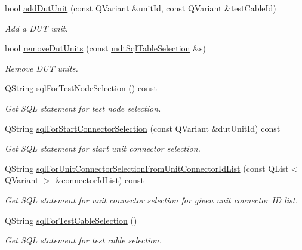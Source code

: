 \begin{DoxyCompactItemize}
bool \hyperlink{classmdt_tt_logical_test_cable_a80a8aea9231b2114d7d134340196cc86}{add\-Dut\-Unit} (const Q\-Variant \&unit\-Id, const Q\-Variant \&test\-Cable\-Id)
\begin{DoxyCompactList}\small\item\em Add a D\-U\-T unit. \end{DoxyCompactList}\item 
bool \hyperlink{classmdt_tt_logical_test_cable_a7aed867d7f19d07e1975ea9139fa0869}{remove\-Dut\-Units} (const \hyperlink{classmdt_sql_table_selection}{mdt\-Sql\-Table\-Selection} \&s)
\begin{DoxyCompactList}\small\item\em Remove D\-U\-T units. \end{DoxyCompactList}\item 
Q\-String \hyperlink{classmdt_tt_logical_test_cable_ac3a200f8db81d3b42ecb8c52aef2ebfa}{sql\-For\-Test\-Node\-Selection} () const 
\begin{DoxyCompactList}\small\item\em Get S\-Q\-L statement for test node selection. \end{DoxyCompactList}\item 
Q\-String \hyperlink{classmdt_tt_logical_test_cable_ab6a8ac0654a22ba2e935f90668549a73}{sql\-For\-Start\-Connector\-Selection} (const Q\-Variant \&dut\-Unit\-Id) const 
\begin{DoxyCompactList}\small\item\em Get S\-Q\-L statement for start unit connector selection. \end{DoxyCompactList}\item 
Q\-String \hyperlink{classmdt_tt_logical_test_cable_a5a9c15b9910b83e71cd99b7bf0243c27}{sql\-For\-Unit\-Connector\-Selection\-From\-Unit\-Connector\-Id\-List} (const Q\-List$<$ Q\-Variant $>$ \&connector\-Id\-List) const 
\begin{DoxyCompactList}\small\item\em Get S\-Q\-L statement for unit connector selection for given unit connector I\-D list. \end{DoxyCompactList}\item 
Q\-String \hyperlink{classmdt_tt_logical_test_cable_a4532a995c5c14e8f75a89cbcf881ebe9}{sql\-For\-Test\-Cable\-Selection} ()
\begin{DoxyCompactList}\small\item\em Get S\-Q\-L statement for test cable selection. \end{DoxyCompactList}\item 

\end{DoxyCompactItemize}
